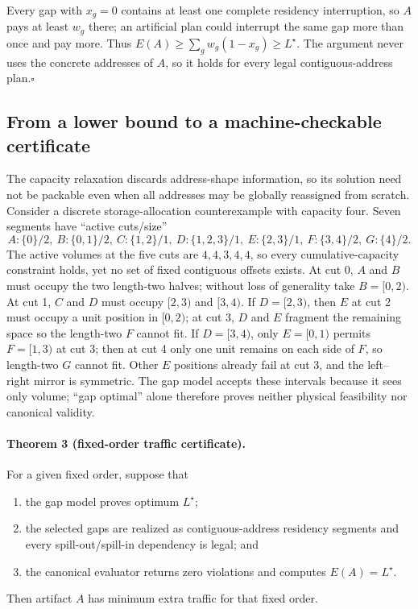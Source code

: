 Every gap with $x_g=0$ contains at least one complete residency interruption, so $A$ pays at least $w_g$ there; an artificial plan could interrupt the same gap more than once and pay more. Thus $E(A)\ge\sum_gw_g(1-x_g)\ge L^\star$. The argument never uses the concrete addresses of $A$, so it holds for every legal contiguous-address plan.\hfill$\square$

\subsection{From a lower bound to a machine-checkable certificate}

The capacity relaxation discards address-shape information, so its solution need not be packable even when all addresses may be globally reassigned from scratch. Consider a discrete storage-allocation counterexample with capacity four. Seven segments have ``active cuts/size''
\[
 A:\{0\}/2,\ B:\{0,1\}/2,\ C:\{1,2\}/1,\
 D:\{1,2,3\}/1,\ E:\{2,3\}/1,\
 F:\{3,4\}/2,\ G:\{4\}/2.
\]
The active volumes at the five cuts are $4,4,3,4,4$, so every cumulative-capacity constraint holds, yet no set of fixed contiguous offsets exists. At cut 0, $A$ and $B$ must occupy the two length-two halves; without loss of generality take $B=[0,2)$. At cut 1, $C$ and $D$ must occupy $[2,3)$ and $[3,4)$. If $D=[2,3)$, then $E$ at cut 2 must occupy a unit position in $[0,2)$; at cut 3, $D$ and $E$ fragment the remaining space so the length-two $F$ cannot fit. If $D=[3,4)$, only $E=[0,1)$ permits $F=[1,3)$ at cut 3; then at cut 4 only one unit remains on each side of $F$, so length-two $G$ cannot fit. Other $E$ positions already fail at cut 3, and the left--right mirror is symmetric. The gap model accepts these intervals because it sees only volume; ``gap optimal'' alone therefore proves neither physical feasibility nor canonical validity.

\paragraph{Theorem 3 (fixed-order traffic certificate).}
For a given fixed order, suppose that
\begin{enumerate}
  \item the gap model proves optimum $L^\star$;
  \item the selected gaps are realized as contiguous-address residency segments and every spill-out/spill-in dependency is legal; and
  \item the canonical evaluator returns zero violations and computes $E(A)=L^\star$.
\end{enumerate}
Then artifact $A$ has minimum extra traffic for that fixed order.


